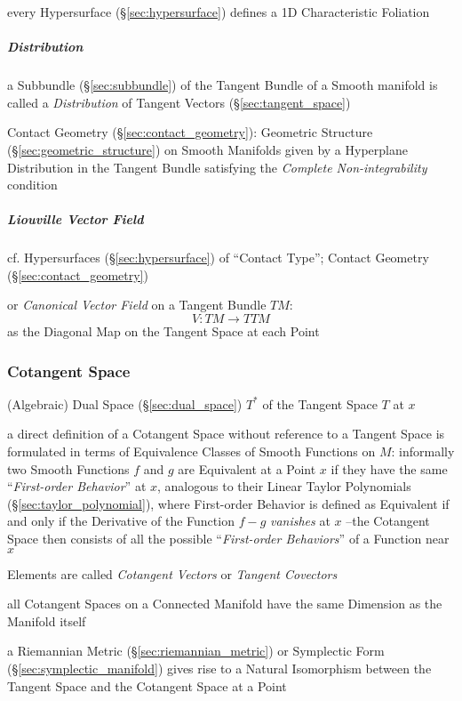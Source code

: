 every Hypersurface (\S\ref{sec:hypersurface}) defines a 1D Characteristic
Foliation



\subparagraph{Distribution}\label{sec:tangent_bundle_distribution}\hfill

a Subbundle (\S\ref{sec:subbundle}) of the Tangent Bundle of a Smooth manifold
is called a \emph{Distribution} of Tangent Vectors (\S\ref{sec:tangent_space})

\fist Contact Geometry (\S\ref{sec:contact_geometry}): Geometric Structure
(\S\ref{sec:geometric_structure}) on Smooth Manifolds given by a Hyperplane
Distribution in the Tangent Bundle satisfying the \emph{Complete
  Non-integrability} condition



\subparagraph{Liouville Vector Field}\label{sec:liouville_vector_field}\hfill


cf. Hypersurfaces (\S\ref{sec:hypersurface}) of ``Contact Type''; \fist Contact
Geometry (\S\ref{sec:contact_geometry})

or \emph{Canonical Vector Field} on a Tangent Bundle $TM$:
\[
  V : TM \rightarrow TTM
\]
as the Diagonal Map on the Tangent Space at each Point



\subsubsection{Cotangent Space}\label{sec:cotangent_space}

(Algebraic) Dual Space (\S\ref{sec:dual_space}) $T^*$ of the Tangent Space $T$
at $x$

a direct definition of a Cotangent Space without reference to a Tangent Space
is formulated in terms of Equivalence Classes of Smooth Functions on $M$:
informally two Smooth Functions $f$ and $g$ are Equivalent at a Point $x$ if
they have the same ``\emph{First-order Behavior}'' at $x$, analogous to their
Linear Taylor Polynomials (\S\ref{sec:taylor_polynomial}), where First-order
Behavior is defined as Equivalent if and only if the Derivative of the Function
$f-g$ \emph{vanishes} at $x$ --the Cotangent Space then consists of all the
possible ``\emph{First-order Behaviors}'' of a Function near $x$

Elements are called \emph{Cotangent Vectors} or \emph{Tangent Covectors}

all Cotangent Spaces on a Connected Manifold have the same Dimension as the
Manifold itself

a Riemannian Metric (\S\ref{sec:riemannian_metric}) or Symplectic Form
(\S\ref{sec:symplectic_manifold}) gives rise to a Natural Isomorphism between
the Tangent Space and the Cotangent Space at a Point



